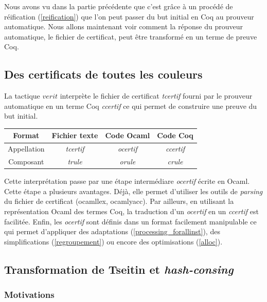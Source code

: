 \documentclass[11pt]{article}
\begin{document}
Nous avons vu dans la partie précédente que c'est grâce à un procédé de réification (\ref{reification}) que l'on peut passer du but initial en Coq au prouveur automatique. Nous allons maintenant voir comment la réponse du prouveur automatique, le fichier de certificat, peut être transformé en un terme de preuve Coq.

\subsection{Des certificats de toutes les couleurs} \label{des_certificats}

La tactique $verit$ interprète le fichier de certificat \textit{tcertif} fourni par le prouveur automatique en un terme Coq \textit{ccertif} ce qui permet de construire une preuve du but initial. \\

\begin{center}
\begin{tabular}{ |c||c|c|c| } 
 \hline
 Format & Fichier texte & Code Ocaml & Code Coq \\ 
 \hline
 Appellation & \textit{tcertif} & \textit{ocertif} & \textit{ccertif} \\ 
 \hline
 Composant & \textit{trule} & \textit{orule} & \textit{crule} \\ 
 \hline
\end{tabular}
\end{center}

Cette interprétation passe par une étape intermédiare \textit{ocertif} écrite en Ocaml. Cette étape a plusieurs avantages. Déjà, elle permet d'utiliser les outils de \textit{parsing} du fichier de certificat (ocamllex, ocamlyacc). Par ailleurs, en utilisant la représentation Ocaml des termes Coq, la traduction d'un \textit{ocertif} en un \textit{ccertif} est facilitée. Enfin, les \textit{ocertif} sont définis dans un format facilement manipulable ce qui permet d'appliquer des adaptations (\ref{processing_forallinst}), des simplifications (\ref{regroupement}) ou encore des optimisations (\ref{alloc}).

\subsection{Transformation de Tseitin et \textit{hash-consing}} \label{tseitin}

\subsubsection{Motivations}
\end{document}
